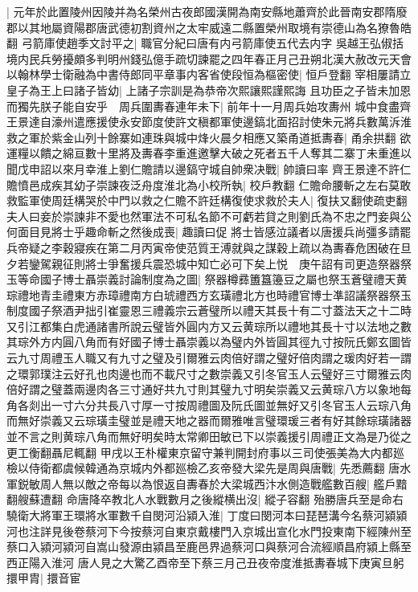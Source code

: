 |{
	元年於此置陵州因陵并為名榮州古夜郎國漢開為南安縣地蕭齊於此晉南安郡隋廢郡以其地屬資陽郡唐武德初割資州之太牢威遠二縣置榮州取境有崇德山為名獠魯皓翻}
弓箭庫使趙季文討平之|{
	職官分紀曰唐有内弓箭庫使五代去内字}
吳越王弘俶括境内民兵勞擾頗多判明州錢弘億手疏切諫罷之四年春正月己丑朔北漢大赦改元天會以翰林學士衛融為中書侍郎同平章事内客省使段恒為樞密使|{
	恒戶登翻}
宰相屢請立皇子為王上曰諸子皆幼|{
	上諸子宗訓是為恭帝次熙讓熙謹熙誨}
且功臣之子皆未加恩而獨先朕子能自安乎　周兵圍夀春連年未下|{
	前年十一月周兵始攻夀州}
城中食盡齊王景達自濠州遣應援使永安節度使許文稹都軍使邊鎬北面招討使朱元將兵數萬泝淮救之軍於紫金山列十餘寨如連珠與城中烽火晨夕相應又築甬道抵夀春|{
	甬余拱翻}
欲運糧以饋之綿亘數十里將及夀春李重進邀擊大破之死者五千人奪其二寨丁未重進以聞戊申詔以來月幸淮上劉仁贍請以邊鎬守城自帥衆决戰|{
	帥讀曰率}
齊王景達不許仁贍憤邑成疾其幼子崇諫夜泛舟度淮北為小校所執|{
	校戶教翻}
仁贍命腰斬之左右莫敢救監軍使周廷構哭於中門以救之仁贍不許廷構復使求救於夫人|{
	復扶又翻使疏吏翻}
夫人曰妾於崇諫非不愛也然軍法不可私名節不可虧若貸之則劉氏為不忠之門妾與公何面目見將士乎趣命斬之然後成喪|{
	趣讀曰促}
將士皆感泣議者以唐援兵尚彊多請罷兵帝疑之李穀寢疾在第二月丙寅帝使范質王溥就與之謀穀上疏以為夀春危困破在旦夕若鑾駕親征則將士爭奮援兵震恐城中知亡必可下矣上悦　庚午詔有司更造祭器祭玉等命國子博士聶崇義討論制度為之圖|{
	祭器樽彞簠簋籩豆之屬也祭玉蒼璧禮天黄琮禮地青圭禮東方赤璋禮南方白琥禮西方玄璜禮北方也時禮官博士凖詔議祭器祭玉制度國子祭酒尹拙引崔靈恩三禮義宗云蒼璧所以禮天其長十有二寸蓋法天之十二時又引江都集白虎通諸書所說云璧皆外圓内方又云黄琮所以禮地其長十寸以法地之數其琮外方内圓八角而有好國子博士聶崇義以為璧内外皆圓其徑九寸按阮氏鄭玄圖皆云九寸周禮玉人職又有九寸之璧及引爾雅云肉倍好謂之璧好倍肉謂之瑗肉好若一謂之環郭璞注云好孔也肉邊也而不載尺寸之數崇義又引冬官玉人云璧好三寸爾雅云肉倍好謂之璧蓋兩邊肉各三寸通好共九寸則其璧九寸明矣崇義又云黄琮八方以象地每角各剡出一寸六分共長八寸厚一寸按周禮圖及阮氏圖並無好又引冬官玉人云琮八角而無好崇義又云琮璜圭璧並是禮天地之器而爾雅唯言璧環瑗三者有好其餘琮璜諸器並不言之則黄琮八角而無好明矣時太常卿田敏已下以崇義援引周禮正文為是乃從之更工衡翻聶尼輒翻}
甲戌以王朴權東京留守兼判開封府事以三司使張美為大内都廵檢以侍衛都虞候韓通為京城内外都廵檢乙亥帝發大梁先是周與唐戰|{
	先悉薦翻}
唐水軍鋭敏周人無以敵之帝每以為恨返自夀春於大梁城西汴水側造戰艦數百艘|{
	艦戶黯翻艘蘇遭翻}
命唐降卒教北人水戰數月之後縱横出沒|{
	縱子容翻}
殆勝唐兵至是命右驍衛大將軍王環將水軍數千自閔河沿潁入淮|{
	丁度曰閔河本曰琵琶溝今名蔡河潁潁河也注詳見後卷蔡河下今按蔡河自東京戴樓門入京城出宣化水門投東南下經陳州至蔡口入潁河潁河自嵩山發源由潁昌至鹿邑界過蔡河口與蔡河合流經順昌府潁上縣至西正陽入淮河}
唐人見之大驚乙酉帝至下蔡三月己丑夜帝度淮抵夀春城下庚寅旦躬擐甲胄|{
	擐音宦}
